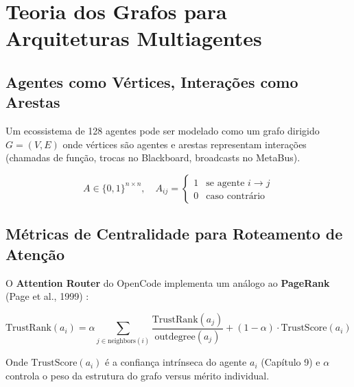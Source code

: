 \section{Teoria dos Grafos para Arquiteturas Multiagentes}

\subsection{Agentes como Vértices, Interações como Arestas}

Um ecossistema de 128 agentes pode ser modelado como um grafo dirigido $G = (V, E)$ onde vértices são agentes e arestas representam interações (chamadas de função, trocas no Blackboard, broadcasts no MetaBus).

\begin{equation}
A \in \{0,1\}^{n \times n}, \quad A_{ij} = \begin{cases} 1 & \text{se agente } i \rightarrow j \\ 0 & \text{caso contrário} \end{cases}
\label{eq:adjacency}
\end{equation}

\subsection{Métricas de Centralidade para Roteamento de Atenção}

O \textbf{Attention Router} do OpenCode implementa um análogo ao \textbf{PageRank} (Page et al., 1999) \cite{page1999pagerank}:

\begin{equation}
\text{TrustRank}(a_i) = \alpha \sum_{j \in \text{neighbors}(i)} \frac{\text{TrustRank}(a_j)}{\text{outdegree}(a_j)} + (1-\alpha) \cdot \text{TrustScore}(a_i)
\label{eq:trustrank}
\end{equation}

Onde $\text{TrustScore}(a_i)$ é a confiança intrínseca do agente $a_i$ (Capítulo 9) e $\alpha$ controla o peso da estrutura do grafo versus mérito individual.

